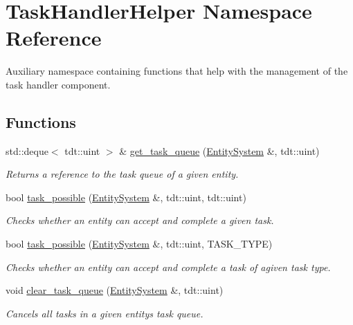 \hypertarget{namespace_task_handler_helper}{}\section{Task\+Handler\+Helper Namespace Reference}
\label{namespace_task_handler_helper}


Auxiliary namespace containing functions that help with the management of the task handler component.  


\subsection*{Functions}
\begin{DoxyCompactItemize}
\item 
std\+::deque$<$ tdt\+::uint $>$ \& \hyperlink{namespace_task_handler_helper_aa6e286a2768e640d5e40d0a4c0271704}{get\+\_\+task\+\_\+queue} (\hyperlink{class_entity_system}{Entity\+System} \&, tdt\+::uint)
\begin{DoxyCompactList}\small\item\em Returns a reference to the task queue of a given entity. \end{DoxyCompactList}\item 
bool \hyperlink{namespace_task_handler_helper_a25347f62f19f42ae65f984acd84c238a}{task\+\_\+possible} (\hyperlink{class_entity_system}{Entity\+System} \&, tdt\+::uint, tdt\+::uint)
\begin{DoxyCompactList}\small\item\em Checks whether an entity can accept and complete a given task. \end{DoxyCompactList}\item 
bool \hyperlink{namespace_task_handler_helper_a4f21590729e6ffb91389d3109f8d48b6}{task\+\_\+possible} (\hyperlink{class_entity_system}{Entity\+System} \&, tdt\+::uint, T\+A\+S\+K\+\_\+\+T\+Y\+PE)
\begin{DoxyCompactList}\small\item\em Checks whether an entity can accept and complete a task of agiven task type. \end{DoxyCompactList}\item 
void \hyperlink{namespace_task_handler_helper_a4d5b618fd172abede20b4bec220a25b0}{clear\+\_\+task\+\_\+queue} (\hyperlink{class_entity_system}{Entity\+System} \&, tdt\+::uint)
\begin{DoxyCompactList}\small\item\em Cancels all tasks in a given entity\textquotesingle{}s task queue. \end{DoxyCompactList}\item 

\end{DoxyCompactItemize}
